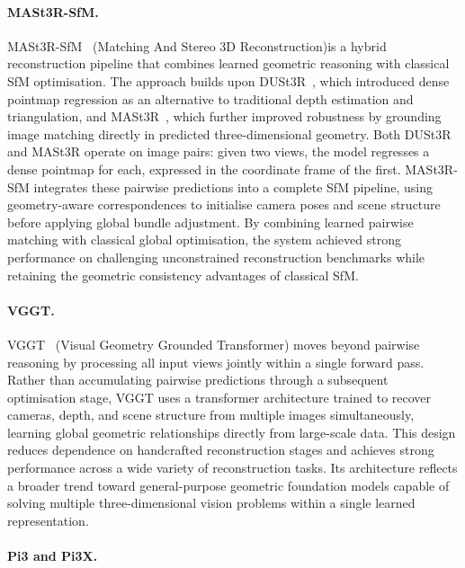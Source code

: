 \paragraph{MASt3R-SfM.}
MASt3R-SfM~\cite{mast3rsfm} (Matching And Stereo 3D Reconstruction)is a hybrid reconstruction pipeline that combines learned
geometric reasoning with classical SfM optimisation. The approach builds upon
DUSt3R~\cite{dust3r}, which introduced dense pointmap regression as an alternative to
traditional depth estimation and triangulation, and MASt3R~\cite{mast3r}, which further
improved robustness by grounding image matching directly in predicted three-dimensional
geometry. Both DUSt3R and MASt3R operate on image pairs: given two views, the model
regresses a dense pointmap for each, expressed in the coordinate frame of the first.
MASt3R-SfM integrates these pairwise predictions into a complete SfM pipeline, using
geometry-aware correspondences to initialise camera poses and scene structure before
applying global bundle adjustment. By combining learned pairwise matching with classical
global optimisation, the system achieved strong performance on challenging unconstrained
reconstruction benchmarks while retaining the geometric consistency advantages of
classical SfM.

\paragraph{VGGT.}
VGGT~\cite{vggt} (Visual Geometry Grounded Transformer) moves beyond pairwise reasoning
by processing all input views jointly within a single forward pass. Rather than
accumulating pairwise predictions through a subsequent optimisation stage, VGGT uses a
transformer architecture trained to recover cameras, depth, and scene structure from
multiple images simultaneously, learning global geometric relationships directly from
large-scale data. This design reduces dependence on handcrafted reconstruction stages
and achieves strong performance across a wide variety of reconstruction tasks. Its
architecture reflects a broader trend toward general-purpose geometric foundation models
capable of solving multiple three-dimensional vision problems within a single learned
representation.
\paragraph{Pi3 and Pi3X.}

